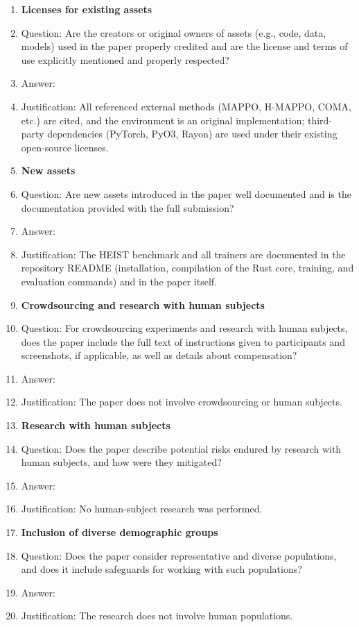 \begin{enumerate}
\item {\bf Licenses for existing assets}
    \item[] Question: Are the creators or original owners of assets (e.g., code, data, models) used in the paper properly credited and are the license and terms of use explicitly mentioned and properly respected?
    \item[] Answer: \answerYes{}
    \item[] Justification: All referenced external methods (MAPPO, H-MAPPO, COMA, etc.) are cited, and the environment is an original implementation; third-party dependencies (PyTorch, PyO3, Rayon) are used under their existing open-source licenses.

\item {\bf New assets}
    \item[] Question: Are new assets introduced in the paper well documented and is the documentation provided with the full submission?
    \item[] Answer: \answerYes{}
    \item[] Justification: The HEIST benchmark and all trainers are documented in the repository README (installation, compilation of the Rust core, training, and evaluation commands) and in the paper itself.

\item {\bf Crowdsourcing and research with human subjects}
    \item[] Question: For crowdsourcing experiments and research with human subjects, does the paper include the full text of instructions given to participants and screenshots, if applicable, as well as details about compensation?
    \item[] Answer: \answerNA{}
    \item[] Justification: The paper does not involve crowdsourcing or human subjects.

\item {\bf Research with human subjects}
    \item[] Question: Does the paper describe potential risks endured by research with human subjects, and how were they mitigated?
    \item[] Answer: \answerNA{}
    \item[] Justification: No human-subject research was performed.

\item {\bf Inclusion of diverse demographic groups}
    \item[] Question: Does the paper consider representative and diverse populations, and does it include safeguards for working with such populations?
    \item[] Answer: \answerNA{}
    \item[] Justification: The research does not involve human populations.


\end{enumerate}
